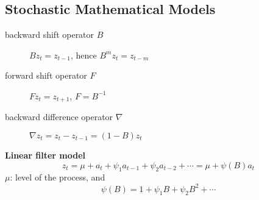 \documentclass{article}
\begin{document}
\subsection{Stochastic Mathematical Models}
\begin{description}
\item [backward shift operator $B$] $Bz_t = z_{t-1}$, hence $B^m z_t = z_{t-m}$
\item [forward shift operator $F$] $Fz_t = z_{t+1}$, $F = B^{-1}$
\item [backward difference operator $\nabla$] $\nabla z_t = z_t - z_{t-1} = (1-B)z_t$
\end{description}

\textbf{Linear filter model}\\
$$z_t = \mu + a_t + \psi_1 a_{t-1} + \psi_2 a_{t-2} + \cdots = \mu + \psi(B) a_t$$
$\mu$: level of the process, and
$$\psi(B) = 1 + \psi_1 B + \psi_2 B^2 + \cdots$$
\end{document}
